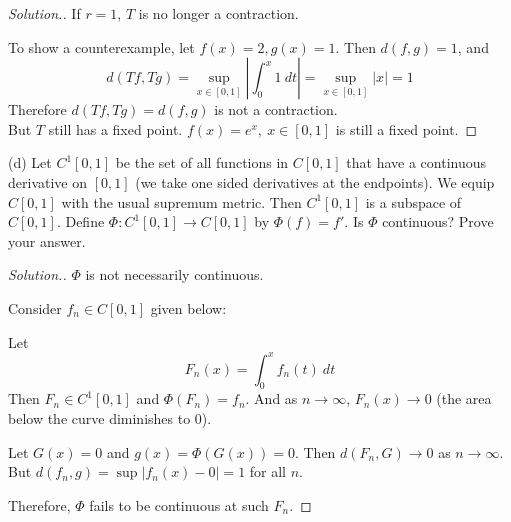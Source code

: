 \documentclass[11pt,a4paper]{amsart}
\def\ra{\rightarrow}
\begin{document}
\begin{proof}[Solution.]
  If $r=1$, $T$ is no longer a contraction.

  To show a counterexample,
  let $f(x)=2, g(x)=1$. Then $d(f,g) = 1$, and
  $$ d(Tf, Tg) = \sup_{x\in[0,1]} \left\rvert \int_0^x 1\ dt \right\rvert = \sup_{x\in[0,1]} |x| = 1 $$
  Therefore $d(Tf, Tg) = d(f,g)$ is not a contraction. \\

  But $T$ still has a fixed point. $f(x) = e^x,\ x\in[0,1]$ is still a fixed point.
\end{proof}
\medskip

(d) Let $C^1[0,1]$ be the set of all functions in $C[0,1]$ that have a continuous derivative on $[0,1]$ (we take one sided derivatives at the endpoints). We equip $C[0,1]$ with the usual supremum metric. Then $C^1[0,1]$ is a subspace of $C[0,1]$.
Define $\Phi:C^1[0,1]\ra C[0,1]$ by $\Phi(f)=f'$. Is $\Phi$ continuous? Prove your answer.

\begin{proof}[Solution.]
  $\Phi$ is not necessarily continuous.

  Consider $f_n \in C[0,1]$ given below:

  \begin{figure}[H]
    \label{fig_2}
  \end{figure}

  Let $$ F_n(x) = \int_0^x f_n(t)\ dt $$
  Then $F_n \in C^1[0,1]$ and $\Phi(F_n) = f_n$.
  And as $n\to\infty$, $F_n(x) \to 0$ (the area below the curve diminishes to $0$).

  Let $G(x)=0$ and $g(x) = \Phi(G(x)) = 0$. Then
  $d(F_n, G) \to 0$ as $n\to\infty$.
  But $d(f_n, g) = \sup |f_n(x) - 0| = 1$ for all $n$.

  Therefore, $\Phi$ fails to be continuous at such $F_n$.
\end{proof}
\end{document}
